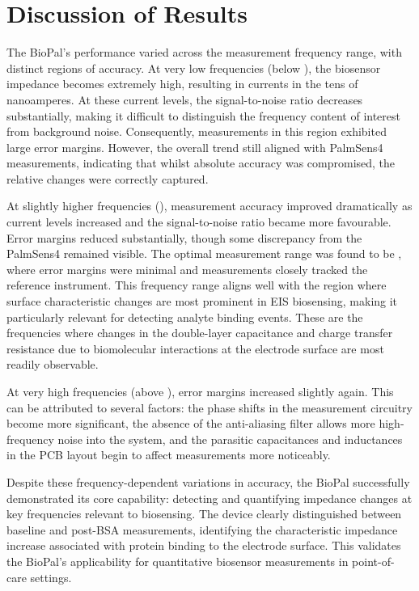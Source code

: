 \section{Discussion of Results}

The BioPal's performance varied across the measurement frequency range, with distinct regions of accuracy. At very low frequencies (below ), the biosensor impedance becomes extremely high, resulting in currents in the tens of nanoamperes. At these current levels, the signal-to-noise ratio decreases substantially, making it difficult to distinguish the frequency content of interest from background noise. Consequently, measurements in this region exhibited large error margins. However, the overall trend still aligned with PalmSens4 measurements, indicating that whilst absolute accuracy was compromised, the relative changes were correctly captured.

At slightly higher frequencies (), measurement accuracy improved dramatically as current levels increased and the signal-to-noise ratio became more favourable. Error margins reduced substantially, though some discrepancy from the PalmSens4 remained visible. The optimal measurement range was found to be , where error margins were minimal and measurements closely tracked the reference instrument. This frequency range aligns well with the region where surface characteristic changes are most prominent in EIS biosensing, making it particularly relevant for detecting analyte binding events. These are the frequencies where changes in the double-layer capacitance and charge transfer resistance due to biomolecular interactions at the electrode surface are most readily observable.

At very high frequencies (above ), error margins increased slightly again. This can be attributed to several factors: the phase shifts in the measurement circuitry become more significant, the absence of the anti-aliasing filter allows more high-frequency noise into the system, and the parasitic capacitances and inductances in the PCB layout begin to affect measurements more noticeably.

Despite these frequency-dependent variations in accuracy, the BioPal successfully demonstrated its core capability: detecting and quantifying impedance changes at key frequencies relevant to biosensing. The device clearly distinguished between baseline and post-BSA measurements, identifying the characteristic impedance increase associated with protein binding to the electrode surface. This validates the BioPal's applicability for quantitative biosensor measurements in point-of-care settings.

